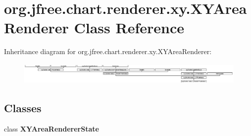 \hypertarget{classorg_1_1jfree_1_1chart_1_1renderer_1_1xy_1_1_x_y_area_renderer}{}\section{org.\+jfree.\+chart.\+renderer.\+xy.\+X\+Y\+Area\+Renderer Class Reference}
\label{classorg_1_1jfree_1_1chart_1_1renderer_1_1xy_1_1_x_y_area_renderer}
Inheritance diagram for org.\+jfree.\+chart.\+renderer.\+xy.\+X\+Y\+Area\+Renderer\+:\begin{figure}[H]
\begin{center}
\leavevmode
\includegraphics[height=1.090343cm]{classorg_1_1jfree_1_1chart_1_1renderer_1_1xy_1_1_x_y_area_renderer}
\end{center}
\end{figure}
\subsection*{Classes}
\begin{DoxyCompactItemize}
\item 
class {\bfseries X\+Y\+Area\+Renderer\+State}
\end{DoxyCompactItemize}
